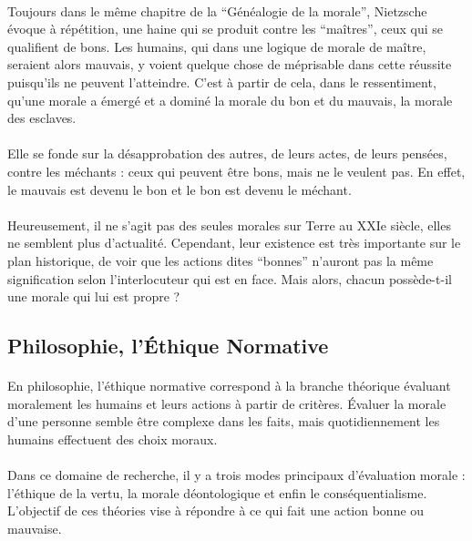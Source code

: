\documentclass[10pt, french, a4paper]{report}
\begin{document}
\paragraph{}
Toujours dans le même chapitre de la ``Généalogie de la morale'', Nietzsche évoque à répétition, une haine qui se produit contre les ``maîtres'', ceux qui se qualifient de bons. Les humains, qui dans une logique de morale de maître, seraient alors mauvais, y voient quelque chose de méprisable dans cette réussite puisqu’ils ne peuvent l’atteindre. C’est à partir de cela, dans le ressentiment, qu’une morale a émergé et a dominé la morale du bon et du mauvais, la morale des esclaves.

\paragraph{}
Elle se fonde sur la désapprobation des autres, de leurs actes, de leurs pensées, contre les méchants : ceux qui peuvent être bons, mais ne le veulent pas. En effet, le mauvais est devenu le bon et le bon est devenu le méchant.

\paragraph{}
Heureusement, il ne s’agit pas des seules morales sur Terre au XXIe siècle, elles ne semblent plus d’actualité. Cependant, leur existence est très importante sur le plan historique, de voir que les actions dites ``bonnes'' n’auront pas la même signification selon l’interlocuteur qui est en face. Mais alors, chacun possède-t-il une morale qui lui est propre ?

\subsection{Philosophie, l'\uppercase{é}thique Normative}
\label{subsec:ethique_jugement_chacun}

\paragraph{}
En philosophie, l'éthique normative correspond à la branche théorique évaluant moralement les humains et leurs actions à partir de critères. \uppercase{é}valuer la morale d'une personne semble être complexe dans les faits, mais quotidiennement les humains effectuent des choix moraux.

\paragraph{}
Dans ce domaine de recherche, il y a trois modes principaux d'évaluation morale : l'éthique de la vertu, la morale déontologique et enfin le conséquentialisme. L'objectif de ces théories vise à répondre à ce qui fait une action bonne ou mauvaise.
\end{document}
